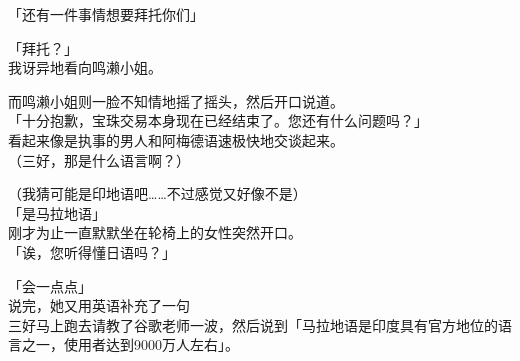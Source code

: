 「还有一件事情想要拜托你们」

「拜托？」\\

我讶异地看向鸣濑小姐。

而鸣濑小姐则一脸不知情地摇了摇头，然后开口说道。\\

「十分抱歉，宝珠交易本身现在已经结束了。您还有什么问题吗？」\\

看起来像是执事的男人和阿梅德语速极快地交谈起来。\\

（三好，那是什么语言啊？）

（我猜可能是印地语吧……不过感觉又好像不是）\\

「是马拉地语」\\

刚才为止一直默默坐在轮椅上的女性突然开口。\\

「诶，您听得懂日语吗？」

「会一点点」\\

说完，她又用英语补充了一句\\

三好马上跑去请教了谷歌老师一波，然后说到「马拉地语是印度具有官方地位的语言之一，使用者达到9000万人左右」。

